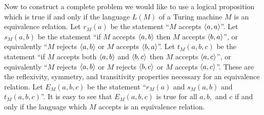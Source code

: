 Now to construct a complete problem we would like to use a logical proposition which is true if and only if the language $L(M)$ of a Turing machine $M$ is an equivalence relation.
Let $r_M(a)$ be the statement ``$M$ accepts $\langle a,a\rangle$''.
Let $s_M(a,b)$ be the statement ``if $M$ accepts $\langle a,b\rangle$ then $M$ accepts $\langle b,a\rangle$'', or equivalently ``$M$ rejects $\langle a,b\rangle$ or $M$ accepts $\langle b,a\rangle$''.
Let $t_M(a,b,c)$ be the statement ``if $M$ accepts both $\langle a,b\rangle$ and $\langle b,c\rangle$ then $M$ accepts $\langle a,c\rangle$'', or equivalently ``$M$ rejects $\langle a,b\rangle$ or $M$ rejects $\langle b,c\rangle$ or $M$ accepts $\langle a,c\rangle$''.
These are the reflexivity, symmetry, and transitivity properties necessary for an equivalence relation.
Let $E_M(a, b, c)$ be the statement ``$r_M(a)$ and $s_M(a, b)$ and $t_M(a, b, c)$''.
It is easy to see that $E_M(a, b, c)$ is true for all $a,b,$ and $c$ if and only if the language which $M$ accepts is an equivalence relation.

